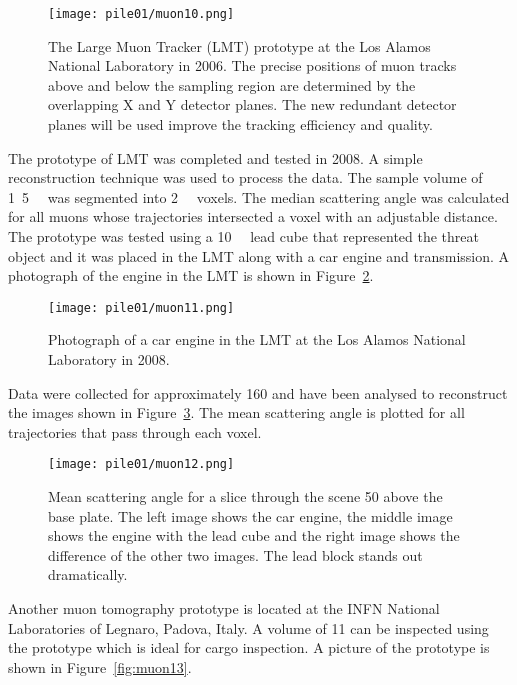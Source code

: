 \documentclass[twoside,titlepage,11pt,twocolumn,a4paper]{article}
\begin{document}
\begin{figure}
  \texttt{[image: pile01/muon10.png]}
  \caption{The Large Muon Tracker (LMT) prototype at the Los Alamos
    National Laboratory in 2006.  The precise positions of muon tracks
    above and below the sampling region are determined by the
    overlapping X and Y detector planes. The new redundant detector
    planes will be used improve the tracking efficiency and
    quality. \citep{green2006}}
  \label{fig:muon10}
\end{figure}

The prototype of LMT was completed and tested in 2008. A simple
reconstruction technique was used to process the data. The sample
volume of \unit{1.5}{\cubic\metre} was segmented
into \unit{2}{\cubic{\centi\metre}} voxels. The median
scattering angle was calculated for all muons whose trajectories
intersected a voxel with an adjustable distance. The prototype was
tested using a \unit{10}{\cubic{\centi\metre}} lead
cube that represented the threat object and it was placed in the LMT
along with a car engine and transmission.  A photograph of the engine
in the LMT is shown in Figure~\ref{fig:muon11}. \citep{morris2008}

\begin{figure}
  \texttt{[image: pile01/muon11.png]}
  \caption{Photograph of a car engine in the LMT at the Los Alamos
    National Laboratory in 2008. \citep{morris2008}}
  \label{fig:muon11}
\end{figure}

Data were collected for approximately \unit{160}{\minute} and have
been analysed to reconstruct the images shown in
Figure~\ref{fig:muon12}. The mean scattering angle is plotted for all
trajectories that pass through each voxel. \citep{morris2008}

\begin{figure}
  \texttt{[image: pile01/muon12.png]}
  \caption{Mean scattering angle for a slice through the scene
    \unit{50}{\centi\metre} above the base plate. The left image shows
    the car engine, the middle image shows the engine with the lead
    cube and the right image shows the difference of the other two
    images. The lead block stands out dramatically. \citep{morris2008}}
  \label{fig:muon12}
\end{figure}

Another muon tomography prototype is located at the INFN National
Laboratories of Legnaro, Padova, Italy. A volume of
\unit{11}{\cubic\metre} can be inspected using the prototype which is
ideal for cargo inspection. A picture of the prototype is shown in
Figure~\ref{fig:muon13}. \citep{pesente2009}
\end{document}
